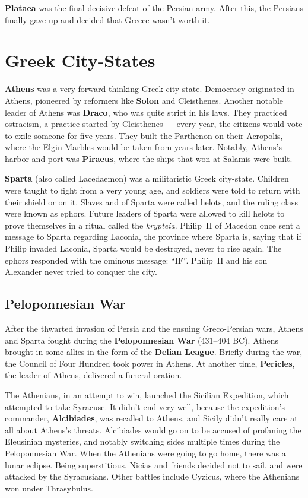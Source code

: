 \textbf{Plataea} was the final decisive defeat of the Persian army.
After this, the Persians finally gave up and decided that Greece wasn't worth it.

\section{Greek City-States}

\textbf{Athens} was a very forward-thinking Greek city-state.
Democracy originated in Athens, pioneered by reformers like \textbf{Solon} and Cleisthenes.
Another notable leader of Athens was \textbf{Draco}, who was quite strict in his laws.
They practiced ostracism, a practice started by Cleisthenes ---
every year, the citizens would vote to exile someone for five years.
They built the Parthenon on their Acropolis, where the Elgin Marbles would be taken from years later.
Notably, Athens's harbor and port was \textbf{Piraeus}, where the ships that won at Salamis were built.

\textbf{Sparta} (also called Lacedaemon) was a militaristic Greek city-state.
Children were taught to fight from a very young age,
and soldiers were told to return with their shield or on it.
Slaves and of Sparta were called helots, and the ruling class were known as ephors.
Future leaders of Sparta were allowed to kill helots to prove themselves in a ritual called the \textit{krypteia}.
Philip~II of Macedon once sent a message to Sparta regarding Laconia, the province where Sparta is,
saying that if Philip invaded Laconia, Sparta would be destroyed, never to rise again.
The ephors responded with the ominous message: ``IF''.
Philip~II and his son Alexander never tried to conquer the city.

\subsection*{Peloponnesian War}

After the thwarted invasion of Persia and the ensuing Greco-Persian wars,
Athens and Sparta fought during the \textbf{Peloponnesian War} (431--404 BC).
Athens brought in some allies in the form of the \textbf{Delian League}.
Briefly during the war, the Council of Four Hundred took power in Athens.
At another time, \textbf{Pericles}, the leader of Athens, delivered a funeral oration.

The Athenians, in an attempt to win, launched the Sicilian Expedition, which attempted to take Syracuse.
It didn't end very well, because the expedition's commander, \textbf{Alcibiades}, was recalled to Athens,
and Sicily didn't really care at all about Athens's threats.
Alcibiades would go on to be accused of profaning the Eleusinian mysteries,
and notably switching sides multiple times during the Peloponnesian War.
When the Athenians were going to go home, there was a lunar eclipse.
Being superstitious, Nicias and friends decided not to sail, and were attacked by the Syracusians.
Other battles include Cyzicus, where the Athenians won under Thrasybulus.

